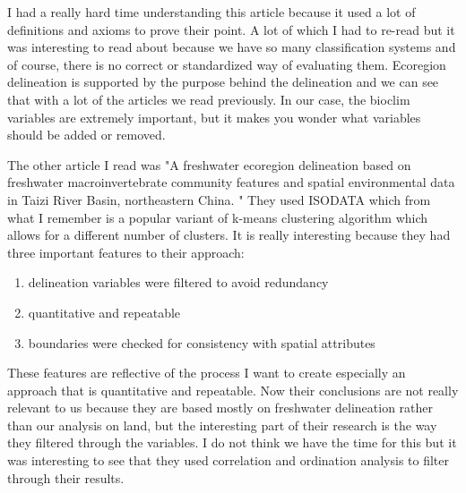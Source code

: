 \documentclass[a4paper,10pt]{article}
\begin{document}
I had a really hard time understanding this article because it used a lot of definitions and axioms to prove their point. A lot of which I had to re-read but it was interesting to read about because we have so many classification systems and of course, there is no correct or standardized way of evaluating them. Ecoregion delineation is supported by the purpose behind the delineation and we can see that with a lot of the articles we read previously. In our case, the bioclim variables are extremely important, but it makes you wonder what variables should be added or removed. 

The other article I read was "A freshwater ecoregion delineation based on freshwater macroinvertebrate community features and spatial environmental data in Taizi River Basin, northeastern China. \cite{kong2013freshwater}" They used ISODATA which from what I remember is a popular variant of k-means clustering algorithm which allows for a different number of clusters. It is really interesting because they had three important features to their approach:
\begin{enumerate}
    \item delineation variables were filtered to avoid redundancy
    \item quantitative and repeatable
    \item boundaries were checked for consistency with spatial attributes
\end{enumerate}
These features are reflective of the process I want to create especially an approach that is quantitative and repeatable. Now their conclusions are not really relevant to us because they are based mostly on freshwater delineation rather than our analysis on land, but the interesting part of their research is the way they filtered through the variables. I do not think we have the time for this but it was interesting to see that they used correlation and ordination analysis to filter through their results.



\end{document}
